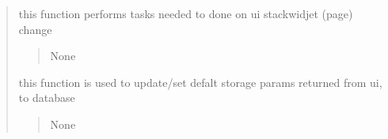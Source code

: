 \documentclass[letterpaper,10pt,english]{sphinxmanual}
\begin{document}
\begin{quote}
\begin{savenotes}
\begin{fulllineitems}
\begin{savenotes}
\begin{fulllineitems}
\begin{quote}
\begin{description}
\end{description}\end{quote}

\end{fulllineitems}\end{savenotes}


\begin{savenotes}\begin{fulllineitems}
\label{\detokenize{setting/setting_api:oxin.setting_api.API.things_to_do_on_stackwidject_change}}
\pysigstartsignatures
{}
\pysigstopsignatures
\sphinxAtStartPar
this function performs tasks needed to done on ui stackwidjet (page) change
\begin{quote}\begin{description}
\sphinxAtStartPar
None

\end{description}\end{quote}

\end{fulllineitems}\end{savenotes}


\begin{savenotes}\begin{fulllineitems}
\label{\detokenize{setting/setting_api:oxin.setting_api.API.update_camera_live_storage_parms}}
\pysigstartsignatures
{}
\pysigstopsignatures
\sphinxAtStartPar
this function is used to update/set defalt storage params returned from ui, to database
\begin{quote}\begin{description}
\sphinxAtStartPar
None

\end{description}\end{quote}

\end{fulllineitems}\end{savenotes}


\end{fulllineitems}
\end{savenotes}
\end{quote}
\end{document}
